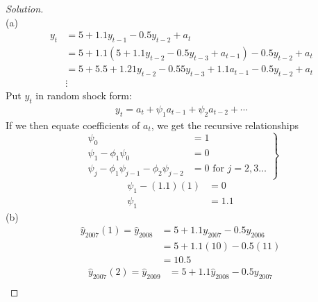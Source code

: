 \documentclass[UTF8,a4paper,14pt]{ctexart}
\newenvironment{solution}
  {\renewcommand\qedsymbol{$\blacksquare$}\begin{proof}[Solution]}
  {\end{proof}}
\theoremstyle{definition}
\theoremstyle{remark}
\begin{document}
\begin{solution}\,\\
(a)\\
  \begin{equation}\
    \begin{aligned}
      y_t &= 5+1.1y_{t-1}-0.5 y_{t-2} + a_t\\
      &=5+1.1(5+1.1y_{t-2}-0.5 y_{t-3} + a_{t-1})-0.5 y_{t-2} + a_t\\
      &=5+5.5+1.21y_{t-2}-0.55y_{t-3}+1.1a_{t-1}-0.5 y_{t-2} + a_t\\
      &\vdots
    \end{aligned}
  \end{equation}  
  Put \(y_t\) in random shock form:
  \begin{equation}\
    \begin{aligned}
      y_t = a_t+ \psi_1 a_{t-1} +\psi_2 a_{t-2}+\cdots
    \end{aligned}
  \end{equation}
  If we then equate coefficients of \(a_t\), we get the recursive relationships
  \begin{equation}\
    \left.
    \begin{aligned}
      \psi_0 &=1\\
      \psi_1-\phi_1\psi_0&=0\\
      \psi_j-\phi_1\psi_{j-1}-\phi_2\psi_{j-2}&=0 \text{ for } j=2,3\ldots
    \end{aligned}
    \right\}
  \end{equation}  
  \begin{equation}
    \begin{aligned}
      \psi_1-(1.1)(1)&=0\\
      \psi_1&=1.1
    \end{aligned}
  \end{equation}
  (b)\\
  \begin{equation}
    \begin{aligned}
      \hat{y}_{2007}(1)=\hat{y}_{2008}&= 5+1.1 y_{2007}-0.5 y_{2006}\\
      &=5+1.1(10)-0.5(11)\\
      &=10.5
    \end{aligned}
  \end{equation}
  \begin{equation}
    \begin{aligned}
      \hat{y}_{2007}(2)=\hat{y}_{2009}&= 5+1.1 \hat{y}_{2008}-0.5 y_{2007}\\

\end{aligned}
\end{equation}
\end{solution}
\end{document}
